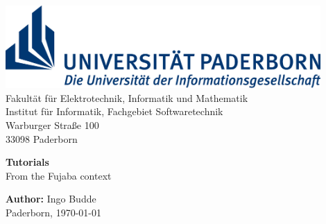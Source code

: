 \documentclass[12pt,a4paper,twoside,titlepage,headsepline,pointlessnumbers,liststotoc,idxtotoc,bibtotoc,ngerman,english]{scrreprt}
\begin{document}
                
             



	\setcounter{page}{1}

	\begin{titlepage}
	\thispagestyle{empty}
	\begin{center}

			\includegraphics[width=12cm]{figures/Logo_Uni_Paderborn}\\
			\textsf{
			Fakultät für Elektrotechnik, Informatik und Mathematik \\
			Institut für Informatik, Fachgebiet Softwaretechnik \\ 
      		Warburger Straße 100 \\
			33098 Paderborn} \\
                    
      \vspace{4cm}									

			{\LARGE  \textbf{Tutorials}} \\ 
			\vspace{0.5cm}
			{\Large From the Fujaba context} \\ 
			\vspace{2.5cm}

			\vspace{0.5cm}
			\textbf{Author:} Ingo Budde \\
			\vspace{1cm}
			Paderborn, \today \\
			\vspace{1cm}
			
	\end{center}
	\end{titlepage}

	\clearpage
		
	\thispagestyle{empty}
	
	\tableofcontents
	
	\clearpage
  
	\setcounter{page}{1}

	
	
	


\end{document}
